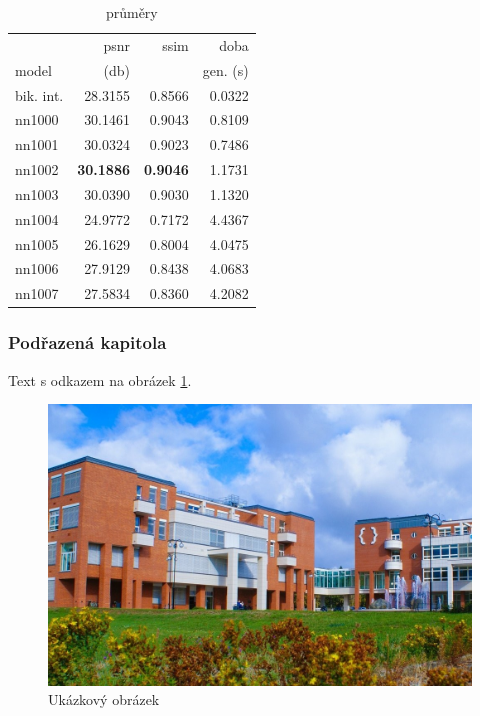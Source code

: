 \begin{table}[hbt!]  
\caption{průměry}
\centering
\begin{tabular}{| l | r | r | r | }
\hline
        &        psnr &      ssim &      doba  \\
model &       (db)    &           & gen. (s) \\
\hline
bik. int. & 28.3155 & 0.8566 & 0.0322 \\
nn1000    & 30.1461 & 0.9043 & 0.8109 \\
nn1001    & 30.0324 & 0.9023 & 0.7486 \\
nn1002    & \textbf{30.1886} & \textbf{0.9046} & 1.1731 \\
nn1003    & 30.0390 & 0.9030 & 1.1320 \\
nn1004    & 24.9772 & 0.7172 & 4.4367 \\
nn1005    & 26.1629 & 0.8004 & 4.0475 \\
nn1006    & 27.9129 & 0.8438 & 4.0683 \\
nn1007    & 27.5834 & 0.8360 & 4.2082 \\
\hline
\end{tabular}
\end{table}


\subsubsection{Podřazená kapitola}
Text s odkazem na obrázek \ref{figure:uhk}.


\begin{figure}[hbt!]
 	\begin{center}
    	\includegraphics[width=\textwidth]{obrazky/uhk.jpg}
 	\end{center}
 	\caption{Ukázkový obrázek}
	\label{figure:uhk}
\end{figure} 


